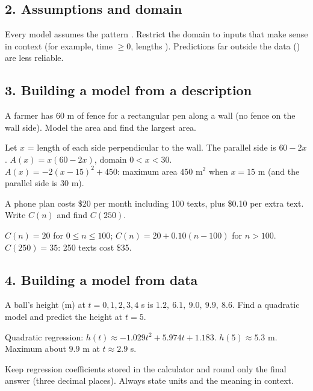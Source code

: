 \subsection*{2. Assumptions and domain}
Every model assumes the pattern . Restrict the domain to inputs that make sense in context (for example, time $\ge0$, lengths ). Predictions far outside the data () are less reliable.

\subsection*{3. Building a model from a description}
A farmer has 60 m of fence for a rectangular pen along a wall (no fence on the wall side). Model the area and find the largest area.
\begin{workspace}[4.6cm]
Let $x$ = length of each side perpendicular to the wall. The parallel side is $60-2x$. $A(x)=x(60-2x)$, domain $0<x<30$.\\
$A(x)=-2(x-15)^2+450$: maximum area $450$ m$^2$ when $x=15$ m (and the parallel side is $30$ m).
\end{workspace}

A phone plan costs \$20 per month including 100 texts, plus \$0.10 per extra text. Write $C(n)$ and find $C(250)$.
\begin{workspace}[2.6cm]
$C(n)=20$ for $0\le n\le100$; $C(n)=20+0.10(n-100)$ for $n>100$. $C(250)=35$: 250 texts cost \$35.
\end{workspace}

\subsection*{4. Building a model from data}
A ball's height (m) at $t=0,1,2,3,4$ s is $1.2,\ 6.1,\ 9.0,\ 9.9,\ 8.6$. Find a quadratic model and predict the height at $t=5$.
\begin{workspace}[2.6cm]
Quadratic regression: $h(t)\approx-1.029t^2+5.974t+1.183$. $h(5)\approx5.3$ m. Maximum about $9.9$ m at $t\approx2.9$ s.
\end{workspace}

\begin{aptip}
Keep regression coefficients stored in the calculator and round only the final answer (three decimal places). Always state units and the meaning in context.
\end{aptip}

